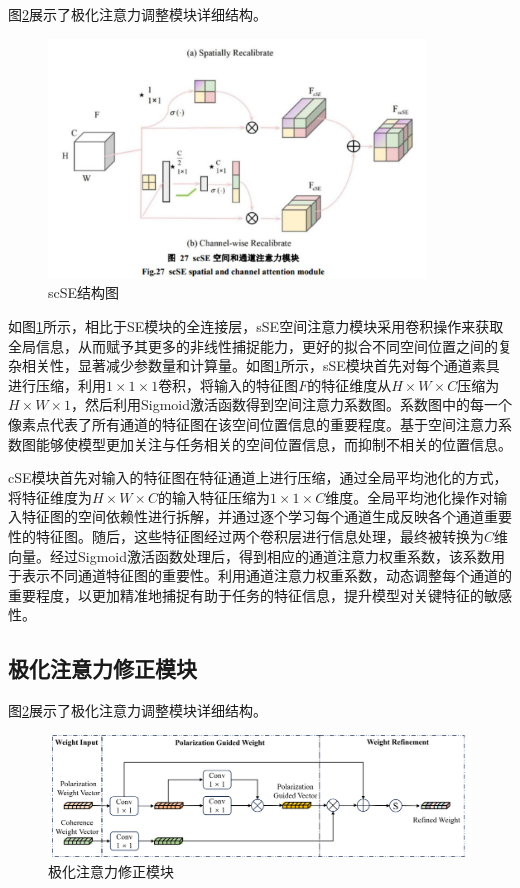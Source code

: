 图\ref{DPEN_WFM}展示了极化注意力调整模块详细结构。
\begin{figure}[h]
    \centering
    \includegraphics[width=10cm]{pic/chapter3/scSE.jpg}
    \caption{scSE结构图}
    \label{scSE}
\end{figure}
如图\ref{scSE}所示，相比于SE模块的全连接层，sSE空间注意力模块采用卷积操作来获取全局信息，从而赋予其更多的非线性捕捉能力，更好的拟合不同空间位置之间的复杂相关性，显著减少参数量和计算量。如图\ref{scSE}所示，sSE模块首先对每个通道素具进行压缩，利用$1\times 1 \times 1$卷积，将输入的特征图$F$的特征维度从$H \times W \times C$压缩为$H \times W \times 1$，然后利用Sigmoid激活函数得到空间注意力系数图。系数图中的每一个像素点代表了所有通道的特征图在该空间位置信息的重要程度。基于空间注意力系数图能够使模型更加关注与任务相关的空间位置信息，而抑制不相关的位置信息。

cSE模块首先对输入的特征图在特征通道上进行压缩，通过全局平均池化的方式，将特征维度为$H \times W \times C$的输入特征压缩为$1 \times 1 \times C$维度。全局平均池化操作对输入特征图的空间依赖性进行拆解，并通过逐个学习每个通道生成反映各个通道重要性的特征图。随后，这些特征图经过两个卷积层进行信息处理，最终被转换为$C$维向量。经过Sigmoid激活函数处理后，得到相应的通道注意力权重系数，该系数用于表示不同通道特征图的重要性。利用通道注意力权重系数，动态调整每个通道的重要程度，以更加精准地捕捉有助于任务的特征信息，提升模型对关键特征的敏感性。

\subsection{极化注意力修正模块}
图\ref{DPEN_WFM}展示了极化注意力调整模块详细结构。
\begin{figure}[h]
    \centering
    \includegraphics[width=14cm]{pic/chapter3/DPEN_WFM.png}
    \caption{极化注意力修正模块}
    \label{DPEN_WFM}
\end{figure}

